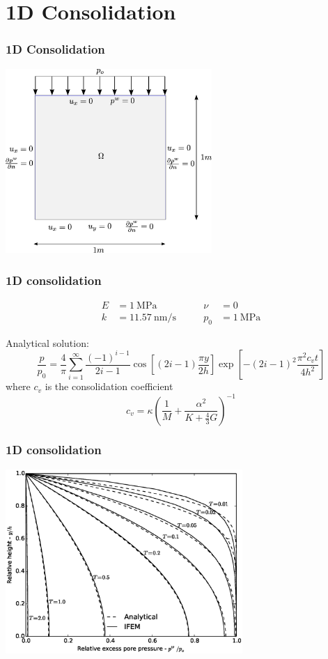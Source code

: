 \documentclass{beamer}
\begin{document}
\section{1D Consolidation}

\begin{frame}
  \frametitle{1D Consolidation}

  \begin{center}
    \includegraphics[height=7cm]{figs/Benchmark1}
  \end{center}
\end{frame}

\begin{frame}
  \frametitle{1D consolidation}

  \begin{align*}
    E &= \SI{1}{\mega\pascal} \qquad & \nu &= 0 \\
    k &= \SI{11.57}{\nano\meter\per\second} \qquad & p_0 &= \SI{1}{\mega\pascal}
  \end{align*}

  Analytical solution:
  \[
    \frac{p}{p_0} = \frac{4}{\pi}
    \sum_{i=1}^\infty \frac{(-1)^{i-1}}{2i-1}
    \cos\left[ (2i-1) \frac{\pi y}{2 h} \right]
    \exp\left[ -(2i-1)^2 \frac{\pi^2 c_v t}{4h^2} \right]
  \]
  where $c_v$ is the consolidation coefficient
  \[
    c_v = \kappa \left( \frac{1}{M} + \frac{\alpha^2}{K + \frac{4}{3}G} \right)^{-1}
  \]
\end{frame}

\begin{frame}
  \frametitle{1D consolidation}

  \begin{center}
    \includegraphics[height=7cm]{figs/PLAXIS_Anasol_v_IFEM}
  \end{center}
\end{frame}
\end{document}
